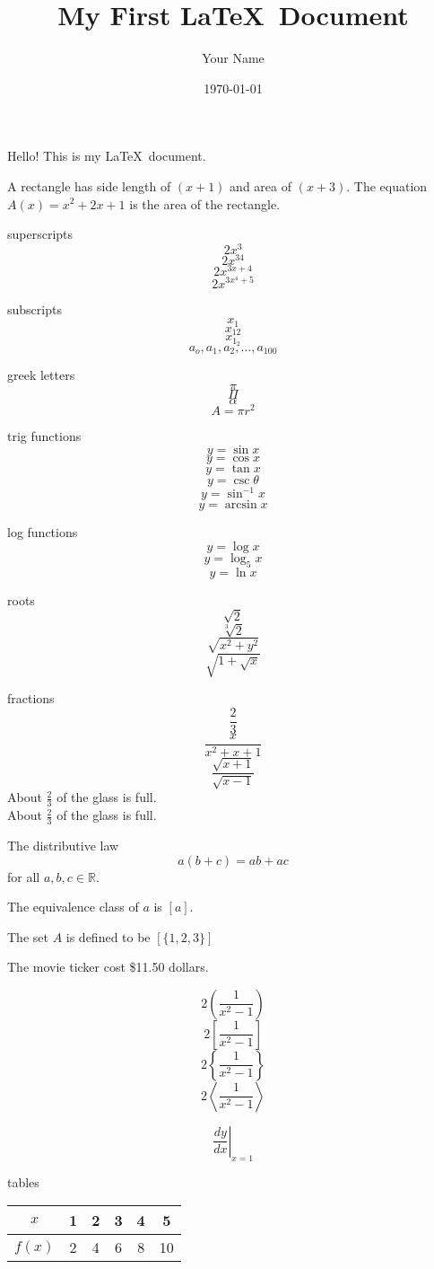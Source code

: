 \documentclass[11pt]{article}
\title{My First \LaTeX\ Document}
\author{Your Name}
\date{\today}
\begin{document}
\tableofcontents
\maketitle

Hello! This is my \LaTeX\ document.

A rectangle has side length of $(x+1)$ and area of $(x+3)$. The equation $A(x)=x^2+2x+1$ is the area of the rectangle.


superscripts $$2x^3$$
$$2x^{34}$$
$$2x^{3x+4}$$
$$2x^{3x^4+5}$$

subscripts $$x_1$$
$$x_{12}$$
$$x_{1_2}$$
$$a_o,a_1,a_2,\ldots,a_{100}$$

greek letters $$\pi$$
$$\Pi$$
$$\alpha$$
$$A=\pi r^2$$

trig functions $$y=\sin x$$
$$y=\cos x$$
$$y=\tan x$$
$$y=\csc \theta$$
$$y=\sin^{-1} x$$
$$y=\arcsin x$$

log functions $$y=\log x$$
$$y=\log_5 x$$
$$y=\ln x$$

roots $$\sqrt{2}$$
$$\sqrt[3]{2}$$
$$\sqrt{x^2+y^2}$$
$$\sqrt{1+\sqrt{x}}$$

fractions $$\frac{2}{3}$$
$$\frac{x}{x^2+x+1}$$
$$\frac{\sqrt{x+1}}{\sqrt{x-1}}$$
About $\displaystyle \frac{2}{3}$ of the glass is full.\\[16pt]
About $\displaystyle \frac{2}{3}$ of the glass is full.

The distributive law $$a(b+c)=ab+ac$$ for all $a, b, c \in \mathbb{R}$.

The equivalence class of $a$ is $[a]$.

The set $A$ is defined to be $[\{1, 2, 3\}]$

The movie ticker cost \$11.50 dollars.

$$2\left(\frac{1}{x^2-1}\right)$$ 
$$2\left[\frac{1}{x^2-1}\right]$$ 
$$2\left\{\frac{1}{x^2-1}\right\}$$
$$2\left\langle\frac{1}{x^2-1}\right\rangle$$

$$\left.\frac{dy}{dx}\right|_{x=1}$$


tables\\[6pt]
\begin{tabular}{|c||c|c|c|c|c|}
 \hline
 $x$ & 1 & 2 & 3 & 4 & 5 \\ \hline
 $f(x)$ & 2 & 4 & 6 & 8 & 10 \\ \hline
\end{tabular}

\vspace{1cm}
\end{document}
